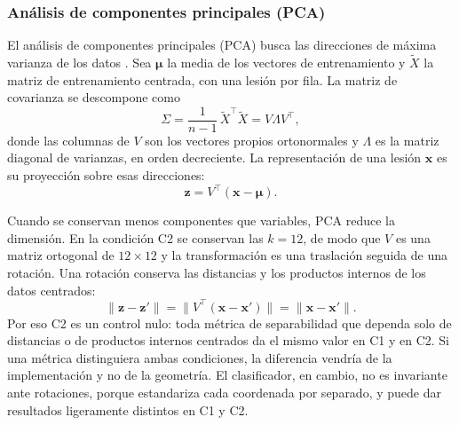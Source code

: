 
\subsubsection{Análisis de componentes principales (PCA)}
\label{sec:pca}

El análisis de componentes principales (PCA) busca las direcciones de máxima varianza de los datos \cite{goodfellow2016deep}. Sea $\boldsymbol{\mu}$ la media de los vectores de entrenamiento y $\tilde{X}$ la matriz de entrenamiento centrada, con una lesión por fila. La matriz de covarianza se descompone como
\begin{equation}
  \Sigma = \frac{1}{n-1}\,\tilde{X}^{\top}\tilde{X} = V \Lambda V^{\top},
  \label{eq:pca_covarianza}
\end{equation}
donde las columnas de $V$ son los vectores propios ortonormales y $\Lambda$ es la matriz diagonal de varianzas, en orden decreciente. La representación de una lesión $\mathbf{x}$ es su proyección sobre esas direcciones:
\begin{equation}
  \mathbf{z} = V^{\top}(\mathbf{x} - \boldsymbol{\mu}).
  \label{eq:pca_proyeccion}
\end{equation}

Cuando se conservan menos componentes que variables, PCA reduce la dimensión. En la condición C2 se conservan las $k = 12$, de modo que $V$ es una matriz ortogonal de $12 \times 12$ y la transformación es una traslación seguida de una rotación. Una rotación conserva las distancias y los productos internos de los datos centrados:
\begin{equation}
  \lVert \mathbf{z} - \mathbf{z}' \rVert = \lVert V^{\top}(\mathbf{x} - \mathbf{x}') \rVert = \lVert \mathbf{x} - \mathbf{x}' \rVert.
  \label{eq:pca_isometria}
\end{equation}
Por eso C2 es un control nulo: toda métrica de separabilidad que dependa solo de distancias o de productos internos centrados da el mismo valor en C1 y en C2. Si una métrica distinguiera ambas condiciones, la diferencia vendría de la implementación y no de la geometría. El clasificador, en cambio, no es invariante ante rotaciones, porque estandariza cada coordenada por separado, y puede dar resultados ligeramente distintos en C1 y C2.
